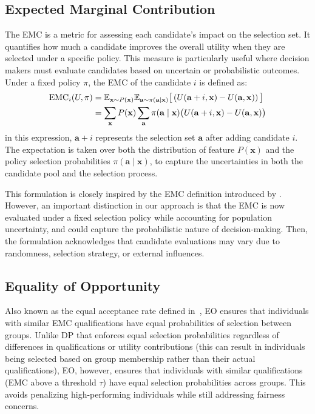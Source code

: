\documentclass[acmlarge]{acmart-ecaf}
\newcommand {\Pfeat} {\mathbf{x}}
\newcommand {\pol} {\pi}
\newcommand {\Pact} {\mathbf{a}}
\begin{document}
\subsection{Expected Marginal Contribution}
The EMC is a metric for assessing each candidate's impact on the selection set. It quantifies how much a candidate improves the overall utility when they are selected under a specific policy. This measure is particularly useful where decision makers must evaluate candidates based on uncertain or probabilistic outcomes. Under a fixed policy \( \pol \), the EMC of the candidate \( i \) is defined as:
\begin{align}
\text{EMC}_i(U, \pol) &= \mathbb{E}_{\Pfeat \sim P(\Pfeat)} \mathbb{E}_{\Pact \sim \pol(\Pact \mid \Pfeat)} \big[\left( U(\Pact + i, \Pfeat) - U(\Pact, \Pfeat) \right) \big] \notag\\
&= \sum_{\Pfeat} P(\Pfeat) \sum_{\Pact} \pol(\Pact \mid \Pfeat) \big( U(\Pact + i, \Pfeat) - U(\Pact, \Pfeat) \big) 
\end{align}
in this expression, \( \Pact + i \) represents the selection set \( \Pact \) after adding candidate \( i \). The expectation is taken over both the distribution of feature $P(\Pfeat)$ and the policy selection probabilities $\pol(\Pact \mid \Pfeat)$, to capture the uncertainties in both the candidate pool and the selection process.

This formulation is closely inspired by the EMC definition introduced by \cite{kleine2022meritocracy}. However, an important distinction in our approach is that the EMC is now evaluated under a fixed selection policy while accounting for population uncertainty, and could capture the probabilistic nature of decision-making.  Then, the formulation acknowledges that candidate evaluations may vary due to randomness, selection strategy, or external influences.


\subsection{Equality of Opportunity}
       
Also known as the equal acceptance rate defined in~\cite{verma2018fairness}, EO ensures that individuals with similar EMC qualifications have equal probabilities of selection between groups. Unlike DP that enforces equal selection probabilities  regardless of differences in qualifications or utility contributions (this can result in individuals being selected based on group membership rather than their actual qualifications), EO, however, ensures that individuals with similar qualifications (EMC above a threshold $\tau$) have equal selection probabilities across groups. This avoids penalizing high-performing individuals while still addressing fairness concerns.
\end{document}
